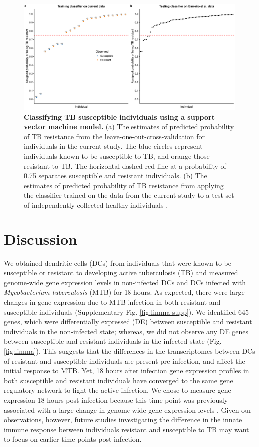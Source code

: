 \begin{figure}[ht]
\centering
\includegraphics[width=5in]{img/ch03/classifier-svm.pdf}
\caption[Classifying TB susceptible individuals using a support vector machine
model.]{
\textbf{Classifying TB susceptible individuals using a support vector machine
model.} (a) The estimates of predicted probability of TB resistance
from the leave-one-out-cross-validation for individuals in the current
study. The blue circles represent individuals known to be susceptible
to TB, and orange those resistant to TB. The horizontal dashed red
line at a probability of 0.75 separates susceptible and resistant
individuals. (b) The estimates of predicted probability of TB
resistance from applying the classifier trained on the data from the
current study to a test set of independently collected healthy
individuals \citep{Barreiro2012}.
}
\label{fig:classifier}
\end{figure}

\section{Discussion}

We obtained dendritic cells (DCs) from individuals that were known to
be susceptible or resistant to developing active tuberculosis (TB) and
measured genome-wide gene expression levels in non-infected DCs and
DCs infected with \emph{Mycobacterium tuberculosis} (MTB) for 18
hours. As expected, there were large changes in gene expression due to
MTB infection in both resistant and susceptible individuals
(Supplementary Fig. \ref{fig:limma-supp}). We identified 645 genes,
which were differentially expressed (DE) between susceptible and
resistant individuals in the non-infected state; whereas, we did not
observe any DE genes between susceptible and resistant individuals in
the infected state (Fig. \ref{fig:limma}). This suggests that the
differences in the transcriptomes between DCs of resistant and
susceptible individuals are present pre-infection, and affect the
initial response to MTB. Yet, 18 hours after infection gene expression
profiles in both susceptible and resistant individuals have converged
to the same gene regulatory network to fight the active infection. We
chose to measure gene expression 18 hours post-infection because this
time point was previously associated with a large change in
genome-wide gene expression levels \citep{Tailleux2008}. Given our
observations, however, future studies investigating the difference in
the innate immune response between individuals resistant and
susceptible to TB may want to focus on earlier time points post
infection.

